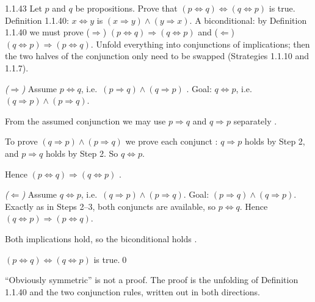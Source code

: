 \begin{bookex}[recommended]{1.1.43}
Let $p$ and $q$ be propositions. Prove that $(p\Leftrightarrow q)\Leftrightarrow(q\Leftrightarrow p)$ is true.
\solution
\given Definition 1.1.40: $x\Leftrightarrow y$ is $(x\Rightarrow y)\wedge(y\Rightarrow x)$.
\goal A biconditional: by Definition 1.1.40 we must prove ($\Rightarrow$) $(p\Leftrightarrow q)\Rightarrow(q\Leftrightarrow p)$ and ($\Leftarrow$) $(q\Leftrightarrow p)\Rightarrow(p\Leftrightarrow q)$.
\plan Unfold everything into conjunctions of implications; then the two halves of the conjunction only need to be swapped (Strategies 1.1.10 and 1.1.7).
\begin{steps}
\item \emph{($\Rightarrow$)} Assume $p\Leftrightarrow q$, i.e.\ $(p\Rightarrow q)\wedge(q\Rightarrow p)$ . Goal: $q\Leftrightarrow p$, i.e.\ $(q\Rightarrow p)\wedge(p\Rightarrow q)$.
\item From the assumed conjunction we may use $p\Rightarrow q$ and $q\Rightarrow p$ separately .
\item To prove $(q\Rightarrow p)\wedge(p\Rightarrow q)$ we prove each conjunct : $q\Rightarrow p$ holds by Step 2, and $p\Rightarrow q$ holds by Step 2. So $q\Leftrightarrow p$.
\item Hence $(p\Leftrightarrow q)\Rightarrow(q\Leftrightarrow p)$ .
\item \emph{($\Leftarrow$)} Assume $q\Leftrightarrow p$, i.e.\ $(q\Rightarrow p)\wedge(p\Rightarrow q)$. Goal: $(p\Rightarrow q)\wedge(q\Rightarrow p)$. Exactly as in Steps 2--3, both conjuncts are available, so $p\Leftrightarrow q$. Hence $(q\Leftrightarrow p)\Rightarrow(p\Leftrightarrow q)$.
\item Both implications hold, so the biconditional holds .
\end{steps}
\conclusion $(p\Leftrightarrow q)\Leftrightarrow(q\Leftrightarrow p)$ is true.\qed
\begin{compare}
\item ``Obviously symmetric'' is not a proof. The proof is the unfolding of Definition 1.1.40 and the two conjunction rules, written out in both directions.
\end{compare}
\end{bookex}


